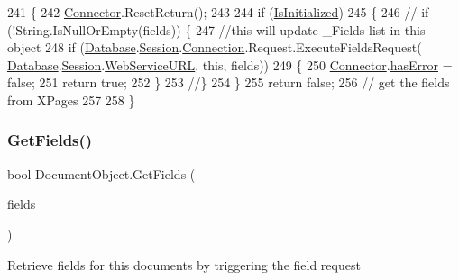 \begin{DoxyCode}
241     \{
242         \mbox{\hyperlink{class_connector}{Connector}}.ResetReturn();
243 
244         \textcolor{keywordflow}{if} (\mbox{\hyperlink{class_document_object_a3b2075b73f38d05091b69decc6ce7992}{IsInitialized}})
245         \{
246             \textcolor{comment}{// if (!String.IsNullOrEmpty(fields)) \{}
247             \textcolor{comment}{//this will update \_Fields list in this object}
248             \textcolor{keywordflow}{if} (\mbox{\hyperlink{class_document_object_a69d5338c9835f748490323d2950eed09}{Database}}.\mbox{\hyperlink{class_database_object_aa8484162b7d2a7c4c9426bca13c64c07}{Session}}.\mbox{\hyperlink{class_session_object_a014bdbf705a753540e19bfb53030c55c}{Connection}}.Request.ExecuteFieldsRequest(
      \mbox{\hyperlink{class_document_object_a69d5338c9835f748490323d2950eed09}{Database}}.\mbox{\hyperlink{class_database_object_aa8484162b7d2a7c4c9426bca13c64c07}{Session}}.\mbox{\hyperlink{class_session_object_a697c071c812fbf7ad1166b896fb44c16}{WebServiceURL}}, \textcolor{keyword}{this}, fields))
249             \{
250                 \mbox{\hyperlink{class_connector}{Connector}}.\mbox{\hyperlink{class_connector_a079bae21a5417efa53bfe8954c0f533f}{hasError}} = \textcolor{keyword}{false};
251                 \textcolor{keywordflow}{return} \textcolor{keyword}{true};
252             \}
253             \textcolor{comment}{//\}}
254         \}
255         \textcolor{keywordflow}{return} \textcolor{keyword}{false};
256         \textcolor{comment}{// get the fields from XPages}
257 
258     \}
\end{DoxyCode}
\mbox{\label{class_document_object_a8e38704e02850b2480d29d184ae2c0e0}} 
\subsubsection{\texorpdfstring{Get\+Fields()}{GetFields()}\hspace{0.1cm}{\footnotesize\ttfamily [2/2]}}
{\footnotesize\ttfamily bool Document\+Object.\+Get\+Fields (\begin{DoxyParamCaption}\item[{I\+List}]{fields }\end{DoxyParamCaption})}



Retrieve fields for this documents by triggering the field request 

